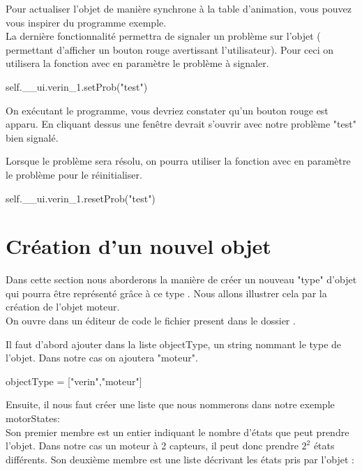 {Pour actualiser l'objet de manière synchrone à la table d'animation, vous pouvez vous inspirer du programme exemple.\\

La dernière fonctionnalité permettra de signaler un problème sur l'objet ( permettant d'afficher un bouton rouge avertissant l'utilisateur). Pour ceci on utilisera la fonction  avec en paramètre le problème à signaler.

\begin{Python}
    self.__ui.verin_1.setProb("test")
\end{Python}

On exécutant le programme, vous devriez constater qu'un bouton rouge est apparu. En cliquant dessus une fenêtre devrait s'ouvrir avec notre problème "test" bien signalé.


Lorsque le problème sera résolu, on pourra utiliser la fonction  avec en paramètre le problème pour le réinitialiser.
\begin{Python}
    self.__ui.verin_1.resetProb("test")
\end{Python}


\section{Création d'un nouvel objet}

Dans cette section nous aborderons la manière de créer un nouveau "type" d'objet qui pourra être représenté grâce à ce type . Nous allons illustrer cela par la création de l'objet moteur.\\


On ouvre dans un éditeur de code le fichier  present dans le dossier .


Il faut d'abord ajouter dans la liste objectType, un string nommant le type de l'objet. Dans notre cas on ajoutera "moteur". 
\begin{Python}
        objectType = ["verin","moteur"]
\end{Python}


Ensuite, il nous faut créer une liste que nous nommerons dans notre exemple motorStates:\\

Son premier membre est un entier indiquant le nombre d'états que peut prendre l'objet. Dans notre cas un moteur à 2 capteurs, il peut donc prendre $ 2^2 $ états différents.
Son deuxième membre est une liste décrivant les états pris par l'objet :

}
